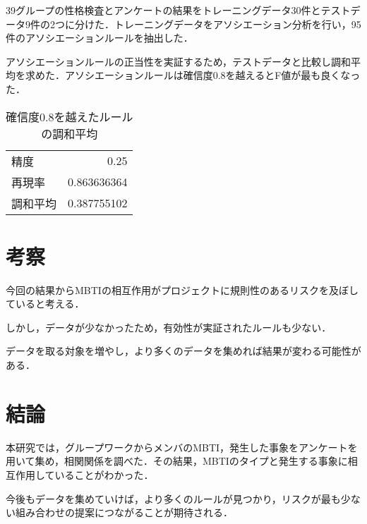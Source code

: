 \documentclass[uplatex,twocolumn,dvipdfmx]{jsarticle}
\begin{document}
39グループの性格検査とアンケートの結果をトレーニングデータ30件とテストデータ9件の2つに分けた．トレーニングデータをアソシエーション分析を行い，95件のアソシエーションルールを抽出した．

アソシエーションルールの正当性を実証するため，テストデータと比較し調和平均を求めた．アソシエーションルールは確信度0.8を越えるとF値が最も良くなった．

\renewcommand{\arraystretch}{0.75}
\begin{table}[htbp]
\centering
\caption{確信度0.8を越えたルールの調和平均}\label{調和平均算出結果}
\begin{tabular}{l|r}
\hline
精度 & 0.25\\
再現率 & 0.863636364\\
調和平均 & 0.387755102\\
\hline
\end{tabular}
\end{table}
\renewcommand{\arraystretch}{0.75}


\section{考察}
今回の結果からMBTIの相互作用がプロジェクトに規則性のあるリスクを及ぼしていると考える．

しかし，データが少なかったため，有効性が実証されたルールも少ない．

データを取る対象を増やし，より多くのデータを集めれば結果が変わる可能性がある．

\section{結論}
本研究では，グループワークからメンバのMBTI，発生した事象をアンケートを用いて集め，相関関係を調べた．その結果，MBTIのタイプと発生する事象に相互作用していることがわかった．

今後もデータを集めていけば，より多くのルールが見つかり，リスクが最も少ない組み合わせの提案につながることが期待される．
\nocite{MBTI}
\nocite{110009915588}

\end{document}
